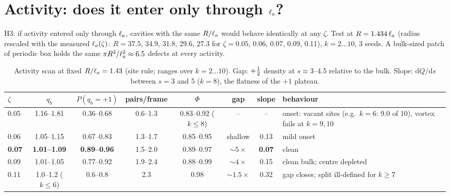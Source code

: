 \section{Activity: does it enter only through $\ell_a$?}\label{sec:activity}
H3: if activity entered only through $\ell_a$, cavities with the same $R/\ell_a$ would behave identically at any $\zeta$. Test at
$R=1.434\,\ell_a$ (radius rescaled with the measured $\ell_a(\zeta)$: $R=37.5$, 34.9, 31.8, 29.6, 27.3 for $\zeta=0.05$, 0.06, 0.07,
0.09, 0.11), $k=2\dots10$, 3 seeds. A bulk-sized patch of periodic box holds the same $\pi R^2/\ell_a^2\approx6.5$ defects at
every activity.
\begin{table}[H]\centering\small
\caption{Activity scan at fixed $R/\ell_a=1.43$ (site rule; ranges over $k=2\dots10$). Gap: $+\tfrac12$ density at $s\approx3$--4.5
relative to the bulk. Slope: $\mathrm{d}Q/\mathrm{d}s$ between $s=3$ and 5 ($k=8$), the flatness of the $+1$ plateau.}\label{tab:act}
\begin{tabularx}{\textwidth}{lccccccX}\toprule
$\zeta$ & $q_b$ & $P(q_b=+1)$ & pairs/frame & $\Phi$ & gap & slope & behaviour\\\midrule
0.05 & 1.16--1.81 & 0.36--0.68 & 0.6--1.3 & 0.83--0.92 ($k\le8$) & -- & -- & onset: vacant sites (e.g.\ $k=6$: 9.0 of 10), vortex fails at $k=9,10$\\
0.06 & 1.05--1.15 & 0.67--0.83 & 1.3--1.7 & 0.85--0.95 & shallow & 0.13 & mild onset\\
\textbf{0.07} & \textbf{1.01--1.09} & \textbf{0.89--0.96} & 1.5--2.0 & 0.89--0.97 & $\sim5\times$ & \textbf{0.07} & clean\\
0.09 & 1.01--1.05 & 0.77--0.92 & 1.9--2.4 & 0.88--0.99 & $\sim4\times$ & 0.15 & clean bulk; centre depleted\\
0.11 & 1.0--1.2 ($k\le6$) & 0.6--0.8 & 2.3 & 0.98 & $\sim1.5\times$ & 0.32 & gap closes; split ill-defined for $k\ge7$\\\bottomrule
\end{tabularx}
\end{table}
